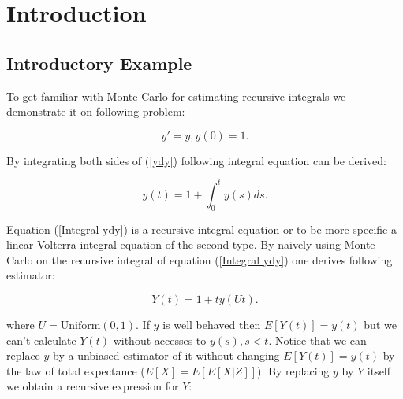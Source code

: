 \documentclass[a4paper,12pt]{article}
\begin{document}
\begin{comment}
\title{Unbiased Monte Carlo for Recursive Integrals}
\author{Isidoor Pinillo Esquivel}
\maketitle
\end{comment}



\newpage
\tableofcontents
\newpage

\begin{abstract}
    We will write this at the end.
\end{abstract}

\section{Introduction}

\subsection{Introductory Example}
To get familiar with Monte Carlo for estimating recursive integrals
we demonstrate it on following problem:

\begin{equation} \label{ydy}
    y'=y, y(0)=1.
\end{equation}

By integrating both sides of (\ref{ydy}) following integral equation can be derived:

\begin{equation} \label{Integral ydy}
    y(t) = 1 + \int_{0}^{t} y(s) ds.
\end{equation}

Equation (\ref{Integral ydy}) is a recursive integral equation or to be more specific
a linear Volterra integral equation of the second type. By naively using Monte
Carlo on the recursive integral of equation (\ref{Integral ydy}) one derives following estimator:

\[
    Y(t) = 1 + t y(Ut)
    .\]

where $U=\text{Uniform}(0,1)$. If $y$ is well behaved then $E[Y(t)]=y(t)$ but we can't
calculate $Y(t)$ without accesses to $y(s),s<t$. Notice that we can replace $y$ by a
unbiased estimator of it without changing $E[Y(t)]=y(t)$ by the law of total expectance
($E[X] = E[E[X|Z]]$). By replacing $y$ by $Y$ itself we obtain a recursive expression for $Y$:
\end{document}
